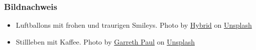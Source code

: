 \documentclass{beamer}
\begin{document}
\begin{frame}
\frametitle{Bildnachweis}
\begin{tiny}



 
\begin{itemize}

\item
Luftballons mit frohen und traurigen Smileys. Photo by \href{https://unsplash.com/@artbyhybrid?utm_source=unsplash&utm_medium=referral&utm_content=creditCopyText}{Hybrid} on \href{https://unsplash.com/s/photos/feedback?utm_source=unsplash&utm_medium=referral&utm_content=creditCopyText}{Unsplash}


\item
Stillleben mit Kaffee. Photo by \href{https://unsplash.com/@garrethpb?utm_source=unsplash&utm_medium=referral&utm_content=creditCopyText}{Garreth Paul} on \href{https://unsplash.com/s/photos/still-life?utm_source=unsplash&utm_medium=referral&utm_content=creditCopyText}{Unsplash}
  
\end{itemize}
\end{tiny}
\end{frame}
\end{document}
